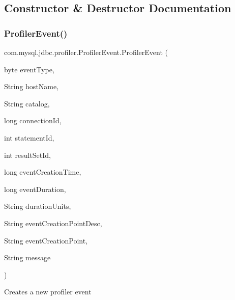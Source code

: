 \subsection{Constructor \& Destructor Documentation}
\mbox{\label{classcom_1_1mysql_1_1jdbc_1_1profiler_1_1_profiler_event_ad8b797e8effa08aa412f59758be2c2b4}} 
\subsubsection{\texorpdfstring{Profiler\+Event()}{ProfilerEvent()}}
{\footnotesize\ttfamily com.\+mysql.\+jdbc.\+profiler.\+Profiler\+Event.\+Profiler\+Event (\begin{DoxyParamCaption}\item[{byte}]{event\+Type,  }\item[{String}]{host\+Name,  }\item[{String}]{catalog,  }\item[{long}]{connection\+Id,  }\item[{int}]{statement\+Id,  }\item[{int}]{result\+Set\+Id,  }\item[{long}]{event\+Creation\+Time,  }\item[{long}]{event\+Duration,  }\item[{String}]{duration\+Units,  }\item[{String}]{event\+Creation\+Point\+Desc,  }\item[{String}]{event\+Creation\+Point,  }\item[{String}]{message }\end{DoxyParamCaption})}

Creates a new profiler event


